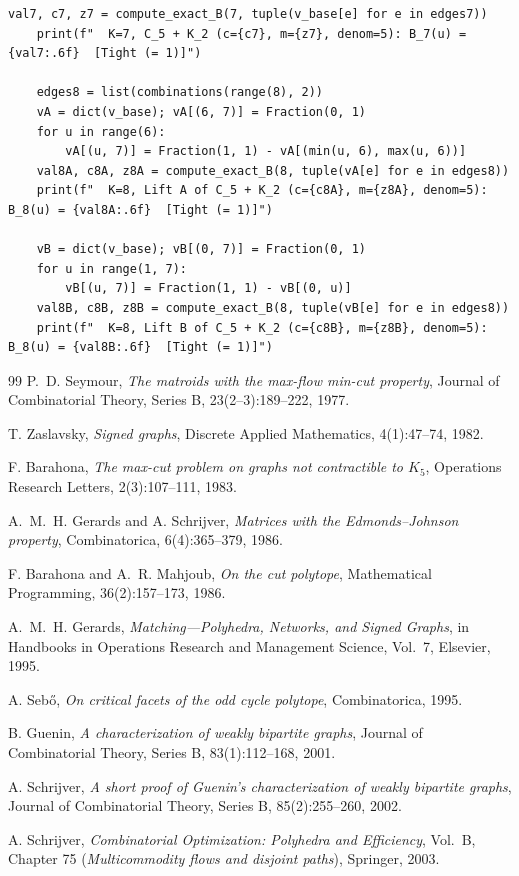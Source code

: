 \documentclass[11pt,a4paper]{ctexart}
\theoremstyle{definition}
\newcommand{\1}{\boldsymbol 1}
\newcommand{\0}{\boldsymbol 0}
\begin{document}
\begin{lstlisting}[style=pycode,caption={$K_{\min}=9$ 充要性定理、10 割/15 割解析下界与极点轨道的精确验证脚本（\texttt{Bgraph\_Kmin\_9\_exact\_verify.py}）}]
    val7, c7, z7 = compute_exact_B(7, tuple(v_base[e] for e in edges7))
    print(f"  K=7, C_5 + K_2 (c={c7}, m={z7}, denom=5): B_7(u) = {val7:.6f}  [Tight (= 1)]")

    edges8 = list(combinations(range(8), 2))
    vA = dict(v_base); vA[(6, 7)] = Fraction(0, 1)
    for u in range(6):
        vA[(u, 7)] = Fraction(1, 1) - vA[(min(u, 6), max(u, 6))]
    val8A, c8A, z8A = compute_exact_B(8, tuple(vA[e] for e in edges8))
    print(f"  K=8, Lift A of C_5 + K_2 (c={c8A}, m={z8A}, denom=5): B_8(u) = {val8A:.6f}  [Tight (= 1)]")

    vB = dict(v_base); vB[(0, 7)] = Fraction(0, 1)
    for u in range(1, 7):
        vB[(u, 7)] = Fraction(1, 1) - vB[(0, u)]
    val8B, c8B, z8B = compute_exact_B(8, tuple(vB[e] for e in edges8))
    print(f"  K=8, Lift B of C_5 + K_2 (c={c8B}, m={z8B}, denom=5): B_8(u) = {val8B:.6f}  [Tight (= 1)]")
\end{lstlisting}

\begin{thebibliography}{99}
P.~D. Seymour, \emph{The matroids with the max-flow min-cut property}, Journal of Combinatorial Theory, Series B, 23(2--3):189--222, 1977.

T. Zaslavsky, \emph{Signed graphs}, Discrete Applied Mathematics, 4(1):47--74, 1982.

F. Barahona, \emph{The max-cut problem on graphs not contractible to $K_5$}, Operations Research Letters, 2(3):107--111, 1983.

A.~M.~H. Gerards and A. Schrijver, \emph{Matrices with the Edmonds--Johnson property}, Combinatorica, 6(4):365--379, 1986.

F. Barahona and A.~R. Mahjoub, \emph{On the cut polytope}, Mathematical Programming, 36(2):157--173, 1986.

A.~M.~H. Gerards, \emph{Matching---Polyhedra, Networks, and Signed Graphs}, in Handbooks in Operations Research and Management Science, Vol.~7, Elsevier, 1995.

A. Seb\H{o}, \emph{On critical facets of the odd cycle polytope}, Combinatorica, 1995.

B. Guenin, \emph{A characterization of weakly bipartite graphs}, Journal of Combinatorial Theory, Series B, 83(1):112--168, 2001.

A. Schrijver, \emph{A short proof of Guenin's characterization of weakly bipartite graphs}, Journal of Combinatorial Theory, Series B, 85(2):255--260, 2002.

A. Schrijver, \emph{Combinatorial Optimization: Polyhedra and Efficiency}, Vol.~B, Chapter 75 (\emph{Multicommodity flows and disjoint paths}), Springer, 2003.
\end{thebibliography}
\end{document}
